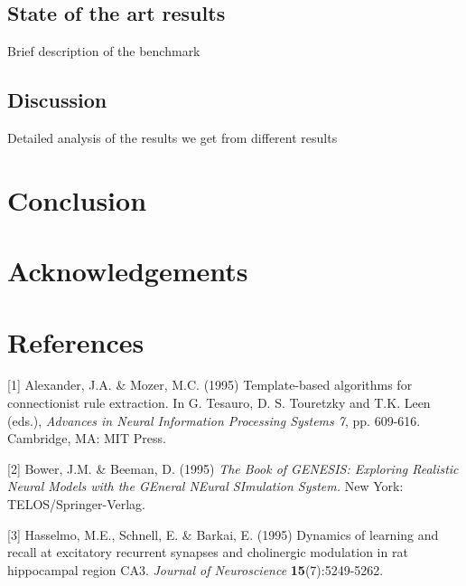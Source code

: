 \documentclass{article} %
\begin{document}
\subsection{State of the art results}
Brief description of the benchmark

\subsection{Discussion}
Detailed analysis of the results we get from different results

\section{Conclusion}

\section{Acknowledgements}

\section{References}

\small{
[1] Alexander, J.A. \& Mozer, M.C. (1995) Template-based algorithms
for connectionist rule extraction. In G. Tesauro, D. S. Touretzky
and T.K. Leen (eds.), {\it Advances in Neural Information Processing
Systems 7}, pp. 609-616. Cambridge, MA: MIT Press.

[2] Bower, J.M. \& Beeman, D. (1995) {\it The Book of GENESIS: Exploring
Realistic Neural Models with the GEneral NEural SImulation System.}
New York: TELOS/Springer-Verlag.

[3] Hasselmo, M.E., Schnell, E. \& Barkai, E. (1995) Dynamics of learning
and recall at excitatory recurrent synapses and cholinergic modulation
in rat hippocampal region CA3. {\it Journal of Neuroscience}
{\bf 15}(7):5249-5262.
}
\end{document}

